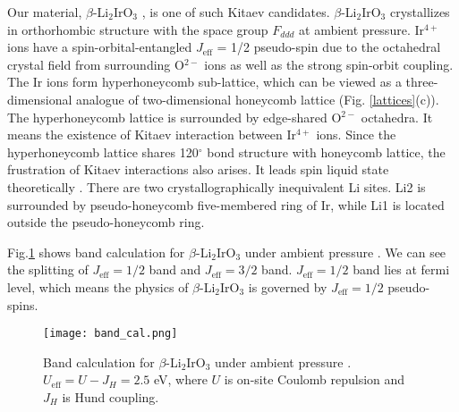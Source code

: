 \documentclass[a4,10.5pt]{report}
\begin{document}
Our material, $\beta$-Li$_2$IrO$_3$ \cite{takayama2015hyperhoneycomb}, is one of such Kitaev candidates.
$\beta$-Li$_2$IrO$_3$ crystallizes in orthorhombic structure with the space group $F_{ddd}$ at ambient pressure. 
Ir$^{4+}$ ions have a spin-orbital-entangled $J_\mathrm{eff}$ = 1/2 pseudo-spin due to the octahedral crystal field from surrounding O$^{2-}$ ions 
as well as the strong spin-orbit coupling. 
The Ir ions form hyperhoneycomb sub-lattice, which can be viewed as a three-dimensional analogue of two-dimensional honeycomb lattice (Fig. \ref{lattices}(c)).  
The hyperhoneycomb lattice is surrounded by edge-shared O$^{2-}$ octahedra.
It means the existence of Kitaev interaction between Ir$^{4+}$ ions.
Since the hyperhoneycomb lattice shares 120$^\circ$ bond structure with honeycomb lattice, the frustration of Kitaev interactions also arises.
It leads spin liquid state theoretically \cite{mandal2009exactly}.
There are two crystallographically inequivalent Li sites. 
Li2 is surrounded by pseudo-honeycomb five-membered ring of Ir, while Li1 is located outside the pseudo-honeycomb ring.

Fig.\ref{band_cal} shows band calculation for $\beta$-Li$_2$IrO$_3$ under ambient pressure \cite{veiga2017pressure}.
We can see the splitting of $J_\mathrm{eff} = 1/2$ band and $J_\mathrm{eff} = 3/2$ band.
$J_\mathrm{eff} = 1/2$ band lies at fermi level, which means the physics of $\beta$-Li$_2$IrO$_3$ is governed by $J_\mathrm{eff} = 1/2$ pseudo-spins.

\begin{figure}
  \centering
  \texttt{[image: band\_cal.png]}
  \caption{Band calculation for $\beta$-Li$_2$IrO$_3$ under ambient pressure \cite{veiga2017pressure}. $U_\mathrm{eff} = U - J_H = 2.5$ eV, where $U$ is on-site Coulomb repulsion
  and $J_H$ is Hund coupling.}
  \label{band_cal}
\end{figure}
\end{document}
